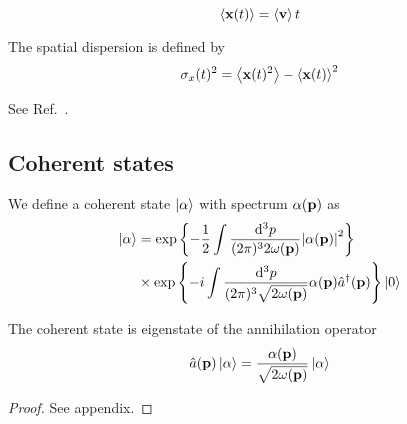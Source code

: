 \begin{example}
	\begin{equation}
		\expval{\vb{x}(t)}
		=
		\expval{\vb{v}}t
	\end{equation}	
\end{example}
\begin{definition}
	The spatial dispersion is defined by
	\begin{equation}
		\sigma_x(t)^2
		=
		\expval{\vb{x}(t)^2}
		-
		\expval{\vb{x}(t)}^2		
	\end{equation}
\end{definition}
\begin{example}
	See Ref.~\cite{Naumov2013}.
\end{example}

\subsection{Coherent states}

\begin{definition}
	We define a coherent state $\ket{\alpha}$ with spectrum $\alpha(\vb{p})$ as
	\begin{equation}
		\begin{split}
			\ket{\alpha}
			&=
			\exp\left\{
				-
				\frac{1}{2}
				\int\frac{\dd[3]{p}}{(2\pi)^32\omega(\vb{p})}
				\abs{\alpha(\vb{p})}^2
			\right\}
			\\
			&\times
			\exp\left\{
				-i
				\int\frac{\dd[3]{p}}{(2\pi)^3\sqrt{2\omega(\vb{p})}}
				\alpha(\vb{p})
				\hat{a}^\dagger(\vb{p})
			\right\}
			\ket{0}
		\end{split}
	\end{equation}
\end{definition}
\begin{theorem}
	The coherent state is eigenstate of the annihilation operator
	\begin{equation}
		\hat{a}(\vb{p})
		\ket{\alpha}
		=
		\frac{\alpha(\vb{p})}{\sqrt{2\omega(\vb{p})}}
		\ket{\alpha}
	\end{equation}
\end{theorem}
\begin{proof}
	See appendix.
\end{proof}

